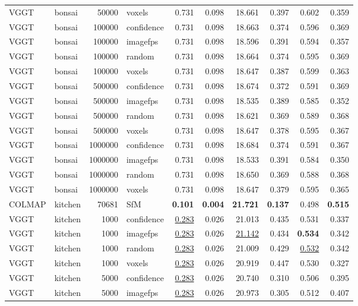 \begin{table}[H]
\begin{tabular}{llrlrrrrrr}
VGGT & bonsai & 50000 & voxels & 0.731 & 0.098 & 18.661 & 0.397 & 0.602 & 0.359 \\
VGGT & bonsai & 100000 & confidence & 0.731 & 0.098 & 18.663 & 0.374 & 0.596 & 0.369 \\
VGGT & bonsai & 100000 & imagefps & 0.731 & 0.098 & 18.596 & 0.391 & 0.594 & 0.357 \\
VGGT & bonsai & 100000 & random & 0.731 & 0.098 & 18.664 & 0.374 & 0.595 & 0.369 \\
VGGT & bonsai & 100000 & voxels & 0.731 & 0.098 & 18.647 & 0.387 & 0.599 & 0.363 \\
VGGT & bonsai & 500000 & confidence & 0.731 & 0.098 & 18.674 & 0.372 & 0.591 & 0.369 \\
VGGT & bonsai & 500000 & imagefps & 0.731 & 0.098 & 18.535 & 0.389 & 0.585 & 0.352 \\
VGGT & bonsai & 500000 & random & 0.731 & 0.098 & 18.621 & 0.369 & 0.589 & 0.368 \\
VGGT & bonsai & 500000 & voxels & 0.731 & 0.098 & 18.647 & 0.378 & 0.595 & 0.367 \\
VGGT & bonsai & 1000000 & confidence & 0.731 & 0.098 & 18.684 & 0.374 & 0.591 & 0.367 \\
VGGT & bonsai & 1000000 & imagefps & 0.731 & 0.098 & 18.533 & 0.391 & 0.584 & 0.350 \\
VGGT & bonsai & 1000000 & random & 0.731 & 0.098 & 18.650 & 0.369 & 0.588 & 0.368 \\
VGGT & bonsai & 1000000 & voxels & 0.731 & 0.098 & 18.647 & 0.379 & 0.595 & 0.365 \\
\midrule
COLMAP & kitchen & 70681 & SfM & \textbf{0.101} & \textbf{0.004} & \textbf{21.721} & \textbf{0.137} & 0.498 & \textbf{0.515} \\
VGGT & kitchen & 1000 & confidence & \underline{0.283} & 0.026 & 21.013 & 0.435 & 0.531 & 0.337 \\
VGGT & kitchen & 1000 & imagefps & \underline{0.283} & 0.026 & \underline{21.142} & 0.434 & \textbf{0.534} & 0.342 \\
VGGT & kitchen & 1000 & random & \underline{0.283} & 0.026 & 21.009 & 0.429 & \underline{0.532} & 0.342 \\
VGGT & kitchen & 1000 & voxels & \underline{0.283} & 0.026 & 20.919 & 0.447 & 0.530 & 0.327 \\
VGGT & kitchen & 5000 & confidence & \underline{0.283} & 0.026 & 20.740 & 0.310 & 0.506 & 0.395 \\
VGGT & kitchen & 5000 & imagefps & \underline{0.283} & 0.026 & 20.973 & 0.305 & 0.512 & 0.407 \\

\end{tabular}
\end{table}
